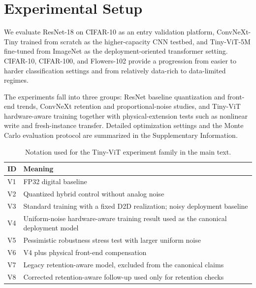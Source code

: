 \section{Experimental Setup}
\label{sec:experimental-setup}

We evaluate ResNet-18 on CIFAR-10 as an entry validation platform, ConvNeXt-Tiny trained from scratch as the higher-capacity CNN testbed, and Tiny-ViT-5M fine-tuned from ImageNet as the deployment-oriented transformer setting. CIFAR-10, CIFAR-100, and Flowers-102 provide a progression from easier to harder classification settings and from relatively data-rich to data-limited regimes.

The experiments fall into three groups: ResNet baseline quantization and front-end trends, ConvNeXt retention and proportional-noise studies, and Tiny-ViT hardware-aware training together with physical-extension tests such as nonlinear write and fresh-instance transfer. Detailed optimization settings and the Monte Carlo evaluation protocol are summarized in the Supplementary Information.

\begin{table}[t]
    \centering
    \caption{Notation used for the Tiny-ViT experiment family in the main text.}
    \label{tab:exp-notation}
    \scriptsize
    \begin{tabular}{lp{}}
        \toprule
        \textbf{ID} & \textbf{Meaning} \\
        \midrule
        V1 & FP32 digital baseline \\
        V2 & Quantized hybrid control without analog noise \\
        V3 & Standard training with a fixed D2D realization; noisy deployment baseline \\
        V4 & Uniform-noise hardware-aware training result used as the canonical deployment model \\
        V5 & Pessimistic robustness stress test with larger uniform noise \\
        V6 & V4 plus physical front-end compensation \\
        V7 & Legacy retention-aware model, excluded from the canonical claims \\
        V8 & Corrected retention-aware follow-up used only for retention checks \\
        \bottomrule
    \end{tabular}
\end{table}

